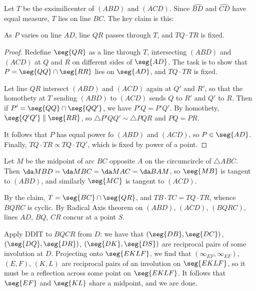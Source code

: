 Let $T$ be the exsimilicenter of $(ABD)$ and $(ACD)$. Since $\widehat{BD}$ and $\widehat{CD}$ have equal measure, $T$ lies on line $BC$. The key claim is this:
\begin{iclaim*}
    As $P$ varies on line $AD$, line $QR$ passes through $T$, and $TQ\cdot TR$ is fixed.
\end{iclaim*}
\begin{proof}
    Redefine $\seg{QR}$ as a line through $T$, intersecting $(ABD)$ and $(ACD)$ at $Q$ and $R$ on different sides of $\seg{AD}$. The task is to show that $P=\seg{QQ}\cap\seg{RR}$ lies on $\seg{AD}$, and $TQ\cdot TR$ is fixed.

    Let line $QR$ intersect $(ABD)$ and $(ACD)$ again at $Q'$ and $R'$, so that the homothety at $T$ sending $(ABD)$ to $(ACD)$ sends $Q$ to $R'$ and $Q'$ to $R$. Then if $P'=\seg{QQ}\cap\seg{QQ'}$, we have $P'Q=P'Q'$. By homothety, $\seg{Q'Q'}\parallel\seg{RR}$, so $\triangle P'QQ'\sim\triangle PQR$ and $PQ=PR$.

    It follows that $P$ has equal power fo $(ABD)$ and $(ACD)$, so $P\in\seg{AD}$. Finally, $TQ\cdot TR\propto TQ\cdot TQ'$, which is fixed by power of a point.
\end{proof}

Let $M$ be the midpoint of arc $BC$ opposite $A$ on the circumcircle of $\triangle ABC$. Then $\da MBD=\da MBC=\da MAC=\da BAM$, so $\seg{MB}$ is tangent to $(ABD)$, and similarly $\seg{MC}$ is tangent to $(ACD)$.

By the claim, $T=\seg{BC}\cap\seg{QR}$, and $TB\cdot TC=TQ\cdot TR$, whence $BQRC$ is cyclic. By Radical Axis theorem on $(ABD)$, $(ACD)$, $(BQRC)$, lines $AD$, $BQ$, $CR$ concur at a point $S$.

Apply DDIT to $BQCR$ from $D$: we have that $(\seg{DB},\seg{DC})$, $(\seg{DQ},\seg{DR})$, $(\seg{DK},\seg{DS})$ are reciprocal pairs of some involution at $D$. Projecting onto $\seg{EKLF}$, we find that $(\infty_{EF},\infty_{EF})$, $(E,F)$, $(K,L)$ are reciprocal pairs of an involution on $\seg{EKLF}$, so it must be a reflection across some point on $\seg{EKLF}$. It follows that $\seg{EF}$ and $\seg{KL}$ share a midpoint, and we are done.

